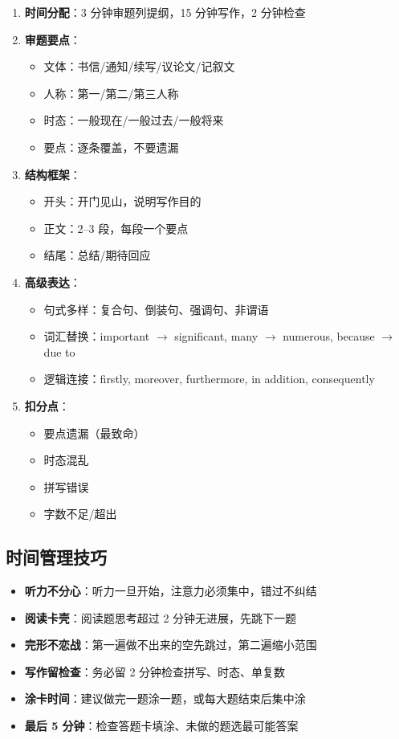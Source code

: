 \begin{enumerate}
  \item \textbf{时间分配}：3 分钟审题列提纲，15 分钟写作，2 分钟检查
  \item \textbf{审题要点}：
    \begin{itemize}
      \item 文体：书信/通知/续写/议论文/记叙文
      \item 人称：第一/第二/第三人称
      \item 时态：一般现在/一般过去/一般将来
      \item 要点：逐条覆盖，不要遗漏
    \end{itemize}
  \item \textbf{结构框架}：
    \begin{itemize}
      \item 开头：开门见山，说明写作目的
      \item 正文：2--3 段，每段一个要点
      \item 结尾：总结/期待回应
    \end{itemize}
  \item \textbf{高级表达}：
    \begin{itemize}
      \item 句式多样：复合句、倒装句、强调句、非谓语
      \item 词汇替换：important $\to$ significant, many $\to$ numerous, because $\to$ due to
      \item 逻辑连接：firstly, moreover, furthermore, in addition, consequently
    \end{itemize}
  \item \textbf{扣分点}：
    \begin{itemize}
      \item 要点遗漏（最致命）
      \item 时态混乱
      \item 拼写错误
      \item 字数不足/超出
    \end{itemize}
\end{enumerate}

\subsection{时间管理技巧}

\begin{itemize}
  \item \textbf{听力不分心}：听力一旦开始，注意力必须集中，错过不纠结
  \item \textbf{阅读卡壳}：阅读题思考超过 2 分钟无进展，先跳下一题
  \item \textbf{完形不恋战}：第一遍做不出来的空先跳过，第二遍缩小范围
  \item \textbf{写作留检查}：务必留 2 分钟检查拼写、时态、单复数
  \item \textbf{涂卡时间}：建议做完一题涂一题，或每大题结束后集中涂
  \item \textbf{最后 5 分钟}：检查答题卡填涂、未做的题选最可能答案
\end{itemize}
